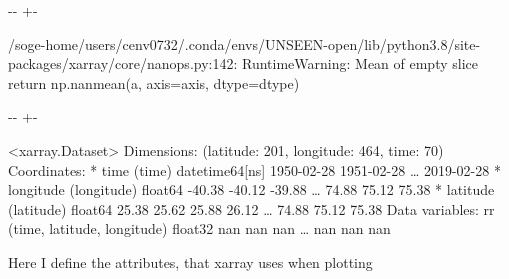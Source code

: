 \documentclass[letterpaper,10pt,english]{sphinxmanual}
\newlength\nbsphinxcodecellspacing
\begin{document}
{

\kern-\sphinxverbatimsmallskipamount\kern-\baselineskip
\kern+\FrameHeightAdjust\kern-\fboxrule
\vspace{\nbsphinxcodecellspacing}

\begin{sphinxVerbatim}[commandchars=\\\{\}]
/soge-home/users/cenv0732/.conda/envs/UNSEEN-open/lib/python3.8/site-packages/xarray/core/nanops.py:142: RuntimeWarning: Mean of empty slice
  return np.nanmean(a, axis=axis, dtype=dtype)
\end{sphinxVerbatim}
}

{

\kern-\sphinxverbatimsmallskipamount\kern-\baselineskip
\kern+\FrameHeightAdjust\kern-\fboxrule
\vspace{\nbsphinxcodecellspacing}

\begin{sphinxVerbatim}[commandchars=\\\{\}]
\llap{\color{nbsphinxout}[5]:\,\hspace{\fboxrule}\hspace{\fboxsep}}<xarray.Dataset>
Dimensions:    (latitude: 201, longitude: 464, time: 70)
Coordinates:
  * time       (time) datetime64[ns] 1950-02-28 1951-02-28 {\ldots} 2019-02-28
  * longitude  (longitude) float64 -40.38 -40.12 -39.88 {\ldots} 74.88 75.12 75.38
  * latitude   (latitude) float64 25.38 25.62 25.88 26.12 {\ldots} 74.88 75.12 75.38
Data variables:
    rr         (time, latitude, longitude) float32 nan nan nan {\ldots} nan nan nan
\end{sphinxVerbatim}
}

Here I define the attributes, that xarray uses when plotting
\end{document}
